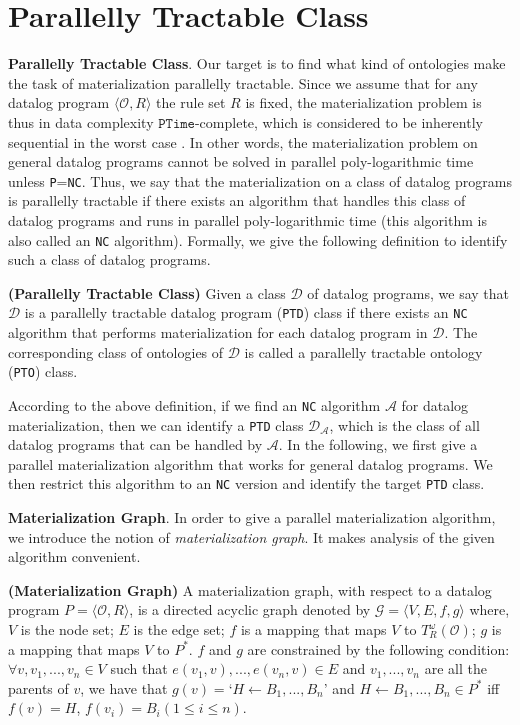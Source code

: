 \documentclass{article}
\begin{document}
\section{Parallelly Tractable Class}

\noindent\textbf{Parallelly Tractable Class}. Our target is to find what kind of ontologies make the task of materialization parallelly tractable. Since we assume that for any datalog program $\langle\mathcal{O}, R\rangle$ the rule set $R$ is fixed, the materialization problem is thus in data complexity $\texttt{PTime}$-complete, which is considered to be inherently sequential in the worst case \cite{RAYMOND-GREENLAW}. In other words, the materialization problem on general datalog programs cannot be solved in parallel poly-logarithmic time unless \texttt{P}=\texttt{NC}. Thus, we say that
the materialization on a class of datalog programs is parallelly tractable if there exists an algorithm that handles this class of datalog programs and runs in parallel poly-logarithmic time (this algorithm is also called an \texttt{NC} algorithm). Formally, we give the following definition to identify such a class of datalog programs.

\begin{definition}\label{def:ptd}
\textbf{(Parallelly Tractable Class)} Given a class $\mathcal{D}$ of datalog programs,
we say that $\mathcal{D}$ is a parallelly tractable datalog program (\texttt{PTD}) class if there exists an \texttt{NC} algorithm that performs materialization for each datalog program in $\mathcal{D}$. The corresponding class of ontologies of $\mathcal{D}$ is called a parallelly tractable ontology (\texttt{PTO}) class.
\end{definition}

According to the above definition, if we find an \texttt{NC} algorithm $\mathcal{A}$ for datalog materialization, then
we can identify a \texttt{PTD} class $\mathcal{D}_{\mathcal{A}}$, which is the class of all datalog programs
that can be handled by $\mathcal{A}$. In the following, we first give a parallel materialization algorithm that works for general datalog programs. We then restrict this algorithm to an \texttt{NC} version and identify the target \texttt{PTD} class.

\textbf{Materialization Graph}. In order to give a parallel materialization algorithm, we introduce the notion of \emph{materialization graph}. It makes analysis of the given algorithm convenient.

\begin{definition}
\textbf{(Materialization Graph)}\label{def:mg} A materialization graph, with respect to
a datalog program $P=\langle\mathcal{O}, R\rangle$, is a directed acyclic graph
denoted by $\mathcal{G}=\langle V, E, f, g\rangle$ where,$V$ is the node set;
$E$ is the edge set; $f$ is a mapping that maps $V$ to $T_R^{\omega}(\mathcal{O})$;
$g$ is a mapping that maps $V$ to $P^*$. $f$ and $g$ are constrained by the following condition:
$\forall v,v_1,...,v_n\in V$ such that $e(v_1, v),...,e(v_n, v)\in E$ and $v_1,...,v_n$ are all the parents of $v$, we have that $g(v)=$`$H\leftarrow B_1,...,B_n$' and $H\leftarrow B_1,...,B_n\in P^*$ iff $f(v)=H$, $f(v_i)=B_i (1\leq i\leq n)$.
\end{definition}
\end{document}
